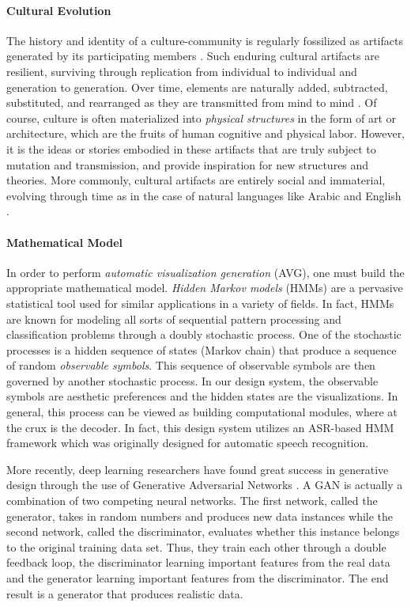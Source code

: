 \documentclass{evolang12}
\begin{document}
\paragraph{Cultural Evolution}
The history and identity of a culture-community is regularly fossilized as artifacts generated by its participating members \cite{dor2015instruction,ferdinand2015inductive}. Such enduring cultural artifacts are resilient, surviving through replication from individual to individual and generation to generation. Over time, elements are naturally added, subtracted, substituted, and rearranged as they are transmitted from mind to mind \cite{ferdinand2015inductive}. Of course, culture is often materialized into \textit{physical structures} in the form of art or architecture, which are the fruits of human cognitive and physical labor. However, it is the ideas or stories embodied in these artifacts that are truly subject to mutation and transmission, and provide inspiration for new structures and theories. More commonly, cultural artifacts are entirely social and immaterial, evolving through time as in the case of natural languages like Arabic and English \cite{ferdinand2019cognitive,dor2015instruction}. 

\paragraph{Mathematical Model}
In order to perform \textit{automatic visualization generation} (AVG), one must build the appropriate mathematical model. \textit{Hidden Markov models} (HMMs) are a pervasive statistical tool used for similar applications in a variety of fields. In fact, HMMs are known for modeling all sorts of sequential pattern processing and classification problems through a doubly stochastic process. One of the stochastic processes is a hidden sequence of states (Markov chain) that produce a sequence of random \textit{observable symbols}. This sequence of observable symbols are then governed by another stochastic process. In our design system, the observable symbols are aesthetic preferences and the hidden states are the visualizations. In general, this process can be viewed as building computational modules, where at the crux is the decoder. In fact, this design system utilizes an ASR-based HMM framework \cite{gales2008application,young2002htk} which was originally designed for automatic speech recognition. 

More recently, deep learning researchers have found great success in generative design through the use of Generative Adversarial Networks \cite{NIPS2014_5423}. A GAN is actually a combination of two competing neural networks. The first network, called the generator, takes in random numbers and produces new data instances while the second network, called the discriminator, evaluates whether this instance belongs to the original training data set. Thus, they train each other through a double feedback loop, the discriminator learning important features from the real data and the generator learning important features from the discriminator. The end result is a generator that produces realistic data.
\end{document}
